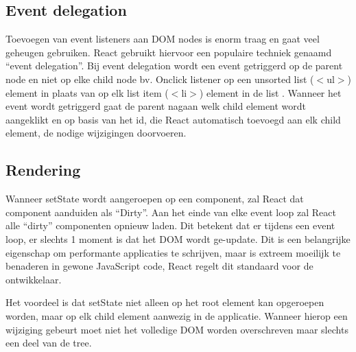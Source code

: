 	\subsection{Event delegation}
		
		Toevoegen van event listeners aan DOM nodes is enorm traag en gaat veel geheugen gebruiken. React gebruikt hiervoor een populaire techniek genaamd ``event delegation''. Bij event delegation wordt een event getriggerd op de parent node en niet op elke child node bv. Onclick listener op een unsorted list ($<$ul$>$) element in plaats van op elk list item ($<$li$>$) element in de list . Wanneer het event wordt getriggerd gaat de parent nagaan welk child element wordt aangeklikt en op basis van het id, die React automatisch toevoegd aan elk child element, de nodige wijzigingen doorvoeren.
	
	\subsection{Rendering}
		
		Wanneer setState wordt aangeroepen op een component, zal React dat component aanduiden als ``Dirty''. Aan het einde van elke event loop zal React alle ``dirty'' componenten opnieuw laden. Dit betekent dat er tijdens een event loop, er slechts 1 moment is dat het DOM wordt ge-update. Dit is een belangrijke eigenschap om performante applicaties te schrijven, maar is extreem moeilijk te benaderen in gewone JavaScript code, React regelt dit standaard voor de ontwikkelaar.
		
		Het voordeel is dat setState niet alleen op het root element kan opgeroepen worden, maar op elk child element aanwezig in de applicatie. Wanneer hierop een wijziging gebeurt moet niet het volledige DOM worden overschreven maar slechts een deel van de tree.
		
